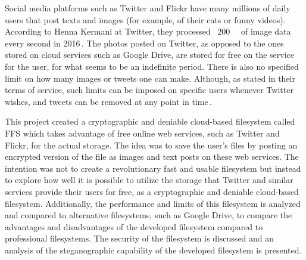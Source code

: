 Social media platforms such as Twitter and Flickr have many millions of daily users that post texts and images (for example, of their cats or funny videos). According to Henna Kermani at Twitter, they processed ~\SI{200}{\giga\byte} of image data every second in 2016\,\cite{MobileScaleLondona}. The photos posted on Twitter, as opposed to the ones stored on cloud services such as Google Drive, are stored for free on the service for the user, for what seems to be an indefinite period. There is also no specified limit on how many images or tweets one can make. Although, as stated in their terms of service, such limits can be imposed on specific users whenever Twitter wishes, and tweets can be removed at any point in time\,\cite{twitterTwitterTermsService2021}.

This project created a cryptographic and deniable cloud-based filesystem called \gls{FFS} which takes advantage of free online web services, such as Twitter and Flickr, for the actual storage. The idea was to save the user's files by posting an encrypted version of the file as images and text posts on these web services. The intention was not to create a revolutionary fast and usable filesystem but instead to explore how well it is possible to utilize the storage that Twitter and similar services provide their users for free, as a cryptographic and deniable cloud-based filesystem. Additionally, the performance and limits of this filesystem is analyzed and compared to alternative filesystems, such as Google Drive, to compare the advantages and disadvantages of the developed filesystem compared to professional filesystems. The security of the filesystem is discussed and an analysis of the steganographic capability of the developed filesystem is presented.

%  











